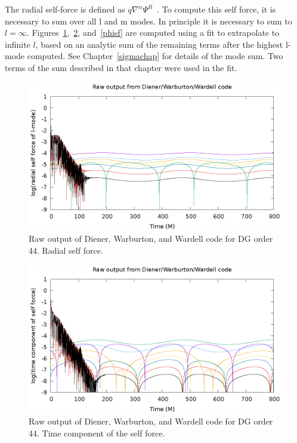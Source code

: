 The radial self-force is defined as $q\nabla^\alpha\Psi^{R}$~\cite{wardell_vega_thornberg_diener_worldtube_ylm_circularorbit}. To compute this self force, it is necessary to sum over all l and m modes. In principle it is necessary to sum to $l=\infty$. Figures~\ref{rsf},~\ref{tsf}, and~\ref{phisf} are computed using a fit to extrapolate to infinite $l$, based on an analytic sum of the remaining terms after the highest l-mode computed. See Chapter~\ref{sigmachap} for details of the mode sum. Two terms of the sum described in that chapter were used in the fit.


\begin{figure}
  \includegraphics{rawRadialSelForceModes}
  \caption{Raw output of Diener, Warburton, and Wardell code for DG order 44. Radial self force.}
  \label{rsf}
\end{figure}

\begin{figure}
  \includegraphics{rawTimeSelfForceModes}
  \caption{Raw output of Diener, Warburton, and Wardell code for DG order 44. Time component of the self force.}
  \label{tsf}
\end{figure}

